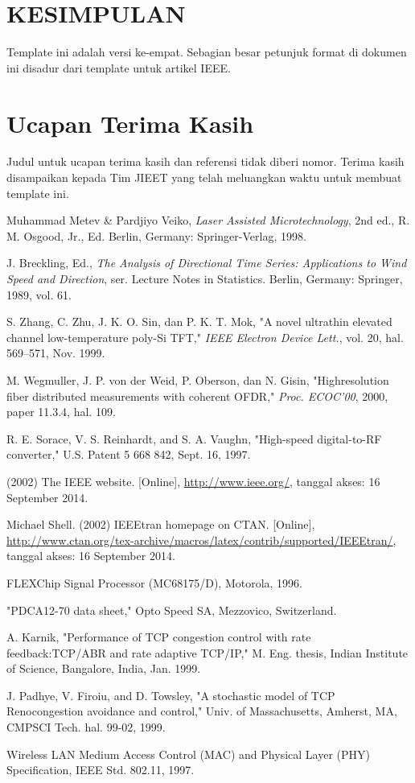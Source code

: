 \documentclass[10pt,twocolumn]{article}
\newcommand{\eightp}{\fontsize{8}{9.6}\selectfont}
\begin{document}
\section{\MakeUppercase{Kesimpulan}}
Template ini adalah versi ke-empat. Sebagian besar petunjuk format di dokumen ini disadur dari template untuk artikel IEEE.

\section*{Ucapan Terima Kasih}
Judul untuk ucapan terima kasih dan referensi tidak diberi nomor. Terima kasih disampaikan kepada Tim JIEET yang telah meluangkan waktu untuk membuat template ini.


\begin{thebibliography}{99}
\eightp
{}
Muhammad Metev \& Pardjiyo Veiko, \textit{Laser Assisted Microtechnology}, 2nd ed., R. M. Osgood, Jr., Ed. Berlin, Germany: Springer-Verlag, 1998.

J. Breckling, Ed., \textit{The Analysis of Directional Time Series: Applications to Wind Speed and Direction}, ser. Lecture Notes in Statistics. Berlin, Germany: Springer, 1989, vol. 61.

S. Zhang, C. Zhu, J. K. O. Sin, dan P. K. T. Mok, "A novel ultrathin elevated channel low-temperature poly-Si TFT," \textit{IEEE Electron Device Lett.}, vol. 20, hal. 569--571, Nov. 1999.

M. Wegmuller, J. P. von der Weid, P. Oberson, dan N. Gisin, "Highresolution fiber distributed measurements with coherent OFDR," \textit{Proc. ECOC'00}, 2000, paper 11.3.4, hal. 109.

R. E. Sorace, V. S. Reinhardt, and S. A. Vaughn, "High-speed digital-to-RF converter," U.S. Patent 5 668 842, Sept. 16, 1997.

(2002) The IEEE website. [Online], \url{http://www.ieee.org/}, tanggal akses: 16 September 2014.

Michael Shell. (2002) IEEEtran homepage on CTAN. [Online], \url{http://www.ctan.org/tex-archive/macros/latex/contrib/supported/IEEEtran/}, tanggal akses: 16 September 2014.

FLEXChip Signal Processor (MC68175/D), Motorola, 1996.

"PDCA12-70 data sheet," Opto Speed SA, Mezzovico, Switzerland.

A. Karnik, "Performance of TCP congestion control with rate feedback:TCP/ABR and rate adaptive TCP/IP," M. Eng. thesis, Indian Institute of Science, Bangalore, India, Jan. 1999.

J. Padhye, V. Firoiu, and D. Towsley, "A stochastic model of TCP Renocongestion avoidance and control," Univ. of Massachusetts, Amherst, MA, CMPSCI Tech. hal. 99-02, 1999.

Wireless LAN Medium Access Control (MAC) and Physical Layer (PHY) Specification, IEEE Std. 802.11, 1997.

\end{thebibliography}
\end{document}
